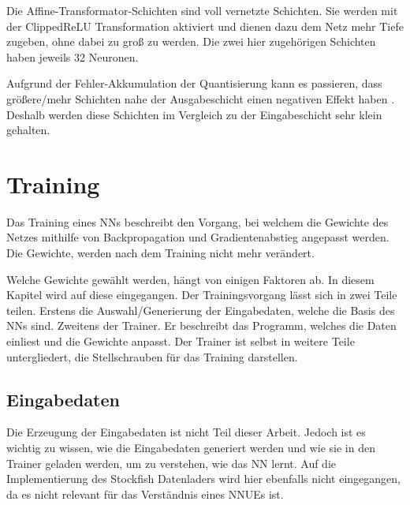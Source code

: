 Die Affine-Transformator-Schichten sind voll vernetzte Schichten. Sie werden mit der Clipped\ac{ReLU} Transformation aktiviert und dienen dazu dem Netz mehr Tiefe zugeben, ohne dabei zu groß zu werden. Die zwei hier zugehörigen Schichten haben jeweils 32 Neuronen.


Aufgrund der Fehler-Akkumulation der Quantisierung kann es passieren, dass größere/mehr Schichten nahe der Ausgabeschicht einen negativen Effekt haben \cite{StockfishNNUE}. Deshalb werden diese Schichten im Vergleich zu der Eingabeschicht sehr klein gehalten.

\section{Training}

Das Training eines \acp{NN} beschreibt den Vorgang, bei welchem die Gewichte des Netzes mithilfe von Backpropagation und Gradientenabstieg angepasst werden. Die Gewichte, werden nach dem Training nicht mehr verändert.

Welche Gewichte gewählt werden, hängt von einigen Faktoren ab. In diesem Kapitel wird auf diese eingegangen. Der Trainingsvorgang lässt sich in zwei Teile teilen. Erstens die Auswahl/Generierung der Eingabedaten, welche die Basis des \acp{NN} sind. Zweitens der Trainer. Er beschreibt das Programm, welches die Daten einliest und die Gewichte anpasst. Der Trainer ist selbst in weitere Teile untergliedert, die Stellschrauben für das Training darstellen.

\subsection{Eingabedaten}
\label{chap:inputdata}

Die Erzeugung der Eingabedaten ist nicht Teil dieser Arbeit. Jedoch ist es wichtig zu wissen, wie die Eingabedaten generiert werden und wie sie in den Trainer geladen werden, um zu verstehen, wie das \ac{NN} lernt. Auf die Implementierung des Stockfish Datenladers wird hier ebenfalls nicht eingegangen, da es nicht relevant für das Verständnis eines \acp{NNUE} ist.

